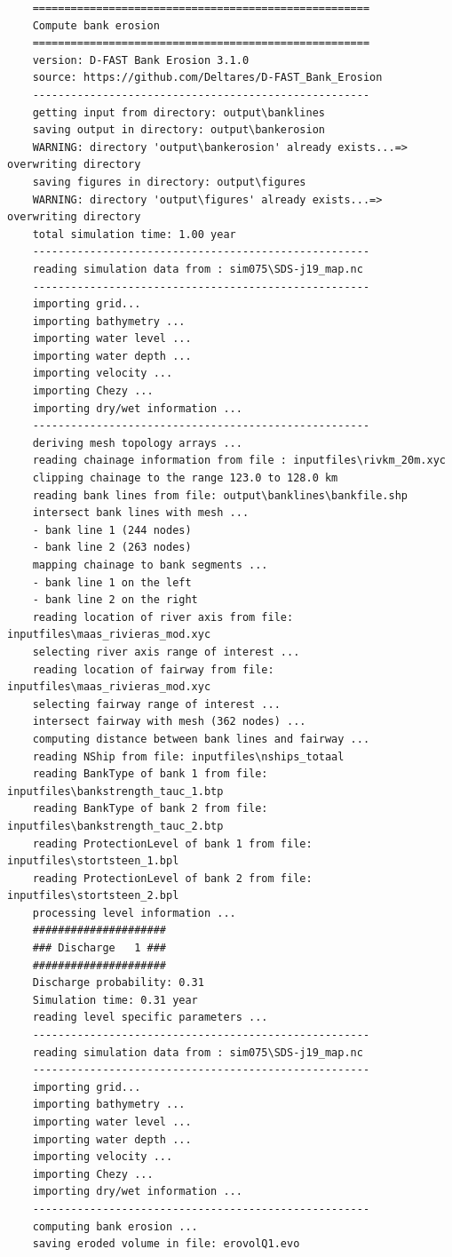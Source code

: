 \newpage
\begin{Verbatim}
	=====================================================
	Compute bank erosion
	=====================================================
	version: D-FAST Bank Erosion 3.1.0
	source: https://github.com/Deltares/D-FAST_Bank_Erosion
	-----------------------------------------------------
	getting input from directory: output\banklines
	saving output in directory: output\bankerosion
	WARNING: directory 'output\bankerosion' already exists...=> overwriting directory
	saving figures in directory: output\figures
	WARNING: directory 'output\figures' already exists...=> overwriting directory
	total simulation time: 1.00 year
	-----------------------------------------------------
	reading simulation data from : sim075\SDS-j19_map.nc
	-----------------------------------------------------
	importing grid...
	importing bathymetry ...
	importing water level ...
	importing water depth ...
	importing velocity ...
	importing Chezy ...
	importing dry/wet information ...
	-----------------------------------------------------
	deriving mesh topology arrays ...
	reading chainage information from file : inputfiles\rivkm_20m.xyc
	clipping chainage to the range 123.0 to 128.0 km
	reading bank lines from file: output\banklines\bankfile.shp
	intersect bank lines with mesh ...
	- bank line 1 (244 nodes)
	- bank line 2 (263 nodes)
	mapping chainage to bank segments ...
	- bank line 1 on the left
	- bank line 2 on the right
	reading location of river axis from file: inputfiles\maas_rivieras_mod.xyc
	selecting river axis range of interest ...
	reading location of fairway from file: inputfiles\maas_rivieras_mod.xyc
	selecting fairway range of interest ...
	intersect fairway with mesh (362 nodes) ...
	computing distance between bank lines and fairway ...
	reading NShip from file: inputfiles\nships_totaal
	reading BankType of bank 1 from file: inputfiles\bankstrength_tauc_1.btp
	reading BankType of bank 2 from file: inputfiles\bankstrength_tauc_2.btp
	reading ProtectionLevel of bank 1 from file: inputfiles\stortsteen_1.bpl
	reading ProtectionLevel of bank 2 from file: inputfiles\stortsteen_2.bpl
	processing level information ...
	#####################
	### Discharge   1 ###
	#####################
	Discharge probability: 0.31
	Simulation time: 0.31 year
	reading level specific parameters ...
	-----------------------------------------------------
	reading simulation data from : sim075\SDS-j19_map.nc
	-----------------------------------------------------
	importing grid...
	importing bathymetry ...
	importing water level ...
	importing water depth ...
	importing velocity ...
	importing Chezy ...
	importing dry/wet information ...
	-----------------------------------------------------
	computing bank erosion ...
	saving eroded volume in file: erovolQ1.evo
	

\end{Verbatim}
